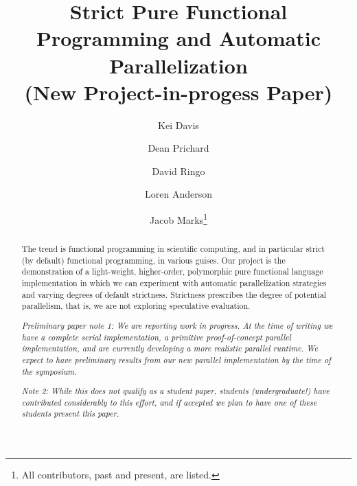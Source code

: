 \documentclass{llncs}
\begin{document}
%
%
\pagestyle{headings}  %
%
%
\title{Strict Pure Functional Programming and Automatic Parallelization\\
       (New Project-in-progess Paper)}
%
%
\author{Kei Davis \and 
        Dean Prichard \and 
        David Ringo \and
        Loren Anderson \and
        Jacob Marks\thanks{All contributors, past and present, are listed.}
}
%
%
%

\maketitle              %

\setcounter{footnote}{0}

\begin{abstract}
The trend is functional programming in scientific computing, and in particular
strict (by default) functional programming, in various guises.  Our project is
the demonstration of a light-weight, higher-order, polymorphic pure functional
language implementation in which we can experiment with automatic
parallelization strategies and varying degrees of default strictness.
Strictness prescribes the degree of potential parallelism, that is, we are not
exploring speculative evaluation.

\emph{Preliminary paper note 1: We are reporting work in progress.  At the time
  of writing we have a complete serial implementation, a primitive
  proof-of-concept parallel implementation, and are currently developing a
  more realistic parallel runtime.  We expect to have preliminary results from
  our new parallel implementation by the time of the symposium.}

\emph{Note 2:  While this does not qualify as a student paper, students (undergraduate!)
have contributed considerably to this effort, and if accepted we plan to have one of these students
present this paper.}


\end{abstract}
\end{document}
